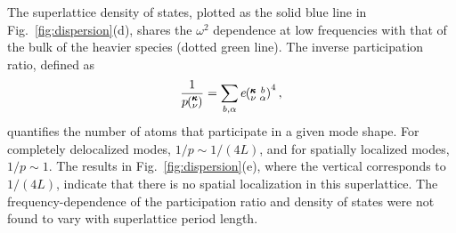 \documentclass[aps,prb,preprint,preprintnumbers,amsmath,amssymb,floatfix,superscriptaddress]{revtex4}
\newcommand{\kvba}{\mspace{-4.0mu}\left(\mspace{-8.0mu}
\begin{smallmatrix} &\pmb{\kappa} &b \\ &\nu &\alpha\end{smallmatrix}
\mspace{-3.0mu}\right)}
\newcommand{\kv}{\mspace{-4.0mu}\left(\mspace{-8.0mu}
\begin{smallmatrix}&\pmb{\kappa} \\&\nu\end{smallmatrix}
\mspace{-3.0mu}\right)}
\begin{document}
The superlattice density of states, plotted as the solid blue line in Fig.~\ref{fig:dispersion}(d), shares the $\omega^2$ dependence at low frequencies with that of the bulk of the heavier species (dotted green line). The inverse participation ratio, defined as\cite{PhysRevB.70.235214}
\begin{equation}\label{EQ:P_ratio}
\begin{split}
\frac{1}{p\kv}=\sum_{b,\alpha}e\kvba^4,
\end{split}
\end{equation}
quantifies the number of atoms that participate in a given mode shape. For completely delocalized modes, $1/p\sim 1/(4L)$, and for spatially localized modes, $1/p\sim 1$. The results in Fig.~\ref{fig:dispersion}(e), where the vertical corresponds to $1/(4L)$, indicate that there is no spatial localization in this superlattice. The frequency-dependence of the participation ratio and density of states were not found to vary with superlattice period length.
\renewcommand{\topfraction}{0.7}
\begin{figure*}%
\begin{center}
\renewcommand{\figure}{Fig.}
\caption{(a,b,c) Dispersion, (d) density of states and (e) inverse participation ratio for a $4\times4$ superlattice. Labeled gray squares represent select modes for Fig.~\ref{fig:sed}. X-$\Gamma$ corresponds to wavevectors along the cross-plane ([1 0 0]) direction, $\Gamma$-A corresponds to wavevectors along the [1 1 1] direction and Z-$\Gamma$ corresponds to wavevectors along the in-plane ([0 1 0]) direction. Orange lines correspond the bulk of the lighter species and green lines correspond to the bulk of the heavier species.}
\label{fig:dispersion}
\end{center}
\end{figure*}
\end{document}
